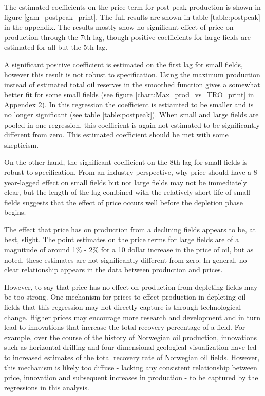 \documentclass[11pt]{article}
\begin{document}
 The estimated coefficients on the price term for post-peak production is shown in figure \ref{gam_postpeak_print}.  The full results are shown in table \ref{table:postpeak} in the appendix.  The results mostly show no significant effect of price on production through the 7th lag, though positive coefficients for large fields are estimated for all but the 5th lag.  

 A significant positive coefficient is estimated on the first lag for small fields, however this result is not robust to specification.  Using the maximum production instead of estimated total oil reserves in the smoothed function gives a somewhat better fit for some small fields (see figure \ref{chart:Max_prod_vs_TRO_print} in Appendex 2).  In this regression the coefficient is estiamted to be smaller and is no longer significant (see table \ref{table:postpeak}).  When small and large fields are pooled in one regression, this coefficient is again not estimated to be significantly different from zero.  This estimated coefficient should be met with some skepticism.  

 On the other hand, the significant coefficient on the 8th lag for small fields is robust to specification. From an industry perspective, why price should have a 8-year-lagged effect on small fields but not large fields may not be immediately clear, but the length of the lag combined with the relatively short life of small fields suggests that the effect of price occurs well before the depletion phase begins.  

The effect that price has on production from a declining fields appears to be, at best, slight.  The point estimates on the price terms for large fields are of a magnitude of around 1\% - 2\% for a 10 dollar increase in the price of oil, but as noted, these estimates are not significantly different from zero.  In general, no clear relationship appears in the data between production and prices.

However, to say that price has no effect on production from depleting fields may be too strong. One mechanism for prices to effect production in depleting oil fields that this regression may not directly capture is through technological change.  Higher prices may encourage more research and development and in turn lead to innovations that increase the total recovery percentage of a field.  For example, over the course of the history of Norwegian oil production, innovations such as horizontal drilling and four-dimensional geological visualization have led to increased estimates of the total recovery rate of Norwegian oil fields.  However, this mechanism is likely too diffuse - lacking any consistent relationship between price, innovation and subsequent increases in production - to be captured by the regressions in this analysis. 
\end{document}
